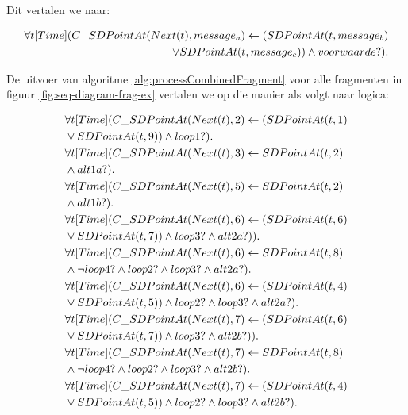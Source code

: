 Dit vertalen we naar:

\begin{align*}
	\forall{t}[Time](C\_SDPointAt(Next(t), message_a) \leftarrow (SDPointAt(t, message_b) \\ \lor SDPointAt(t, message_c)) \land voorwaarde?).
\end{align*}

De uitvoer van algoritme \ref{alg:processCombinedFragment} voor alle fragmenten in figuur \ref{fig:seq-diagram-frag-ex} vertalen we op die manier als volgt naar logica:

\begin{align*}
	&\forall{t}[Time](C\_SDPointAt(Next(t), 2) \leftarrow (SDPointAt(t, 1) \\ &\lor SDPointAt(t, 9)) \land loop1?). \\
	&\forall{t}[Time](C\_SDPointAt(Next(t), 3) \leftarrow SDPointAt(t, 2) \\ &\land alt1a?). \\
	&\forall{t}[Time](C\_SDPointAt(Next(t), 5) \leftarrow SDPointAt(t, 2) \\ &\land alt1b?). \\
	&\forall{t}[Time](C\_SDPointAt(Next(t), 6) \leftarrow (SDPointAt(t, 6) \\ &\lor SDPointAt(t, 7)) \land loop3? \land alt2a?)). \\
	&\forall{t}[Time](C\_SDPointAt(Next(t), 6) \leftarrow SDPointAt(t, 8) \\ &\land \lnot loop4? \land loop2? \land loop3? \land alt2a?). \\
	&\forall{t}[Time](C\_SDPointAt(Next(t), 6) \leftarrow (SDPointAt(t, 4) \\ &\lor SDPointAt(t, 5)) \land loop2? \land loop3? \land alt2a?). \\
	&\forall{t}[Time](C\_SDPointAt(Next(t), 7) \leftarrow (SDPointAt(t, 6) \\ &\lor SDPointAt(t, 7)) \land loop3? \land alt2b?)). \\
	&\forall{t}[Time](C\_SDPointAt(Next(t), 7) \leftarrow SDPointAt(t, 8) \\ &\land \lnot loop4? \land loop2? \land loop3? \land alt2b?). \\
	&\forall{t}[Time](C\_SDPointAt(Next(t), 7) \leftarrow (SDPointAt(t, 4) \\ &\lor SDPointAt(t, 5)) \land loop2? \land loop3? \land alt2b?).
\end{align*}

